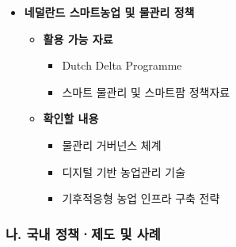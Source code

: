 \begin{itemize}
    \begin{itemize}
        \item \textbf{활용 가능 자료}
        \begin{itemize}
            \item 일본 농림수산성(MAFF) 정책자료
            \item 국토강인화 기본계획
            \item 농업농촌정비사업 사례
        \end{itemize}

        \item \textbf{확인할 내용}
        \begin{itemize}
            \item 재해예방형 기반정비 정책
            \item 농업용수 및 배수관리 정책
            \item 농촌공간 재구조화 전략
        \end{itemize}
    \end{itemize}

    \item \textbf{네덜란드 스마트농업 및 물관리 정책}

    \begin{itemize}
        \item \textbf{활용 가능 자료}
        \begin{itemize}
            \item Dutch Delta Programme
            \item 스마트 물관리 및 스마트팜 정책자료
        \end{itemize}

        \item \textbf{확인할 내용}
        \begin{itemize}
            \item 물관리 거버넌스 체계
            \item 디지털 기반 농업관리 기술
            \item 기후적응형 농업 인프라 구축 전략
        \end{itemize}
    \end{itemize}

\end{itemize}

\subsubsection*{나. 국내 정책ㆍ제도 및 사례}

